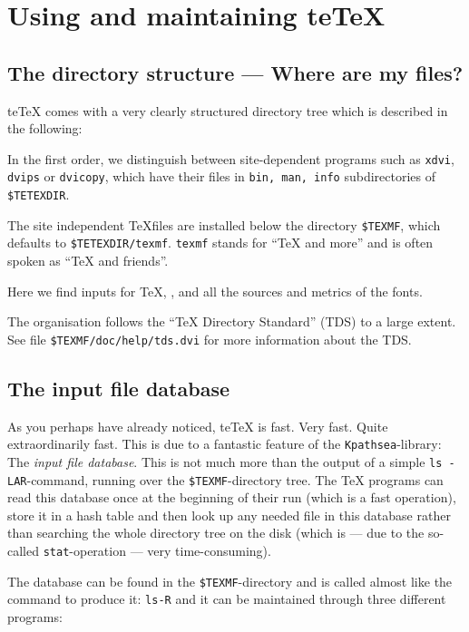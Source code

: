 \documentclass[12pt,a4paper]{article}
\newcommand{\teTeX}{\textrm{te}\TeX\xspace}
\begin{document}
\section{Using and maintaining te\TeX}
\label{sec:using}

\subsection{The directory structure --- Where are my files?}
\label{ssec:locs}

\teTeX{} comes with a very clearly structured directory tree
which is described in the following:

In the first order, we distinguish between site-dependent
programs such as {\tt xdvi}, {\tt dvips} or {\tt dvicopy},
which have their files in {\tt bin, man, info} subdirectories of 
{\tt \$TETEXDIR}.

The site independent \TeX files are installed below the directory
\verb|$TEXMF|, which defaults to {\tt \$TETEXDIR/texmf}.  \verb|texmf|
stands for ``\TeX{} and more'' and is often spoken as ``\TeX{} and
friends''.

Here we find inputs for \TeX{}, \MF{}, \BibTeX{} and all the
sources and metrics of the fonts.

The organisation follows the ``TeX Directory Standard'' (TDS) to a
large extent. See file {\tt \$TEXMF/doc/help/tds.dvi} for more
information about the TDS.

\subsection{The input file database}
\label{ssec:the}

As you perhaps have already noticed, \teTeX{} is fast. Very
fast.  Quite extraordinarily fast. This is due to a fantastic
feature of the {\tt Kpathsea}-library: The
\emph{input file database}. This is not much more than the
output of a simple {\tt ls -LAR}-command, running over the
\verb|$TEXMF|-directory tree. The \TeX{} programs can read
this database once at the beginning of their run (which is a
fast operation), store it in a hash table and then look up
any needed file in this database rather than searching the
whole directory tree on the disk (which is --- due to the
so-called {\tt stat}-operation --- very time-consuming).

The database can be found in the \verb|$TEXMF|-directory and
is called almost like the command to produce it: {\tt ls-R}
and it can be maintained through three different programs:
\end{document}
